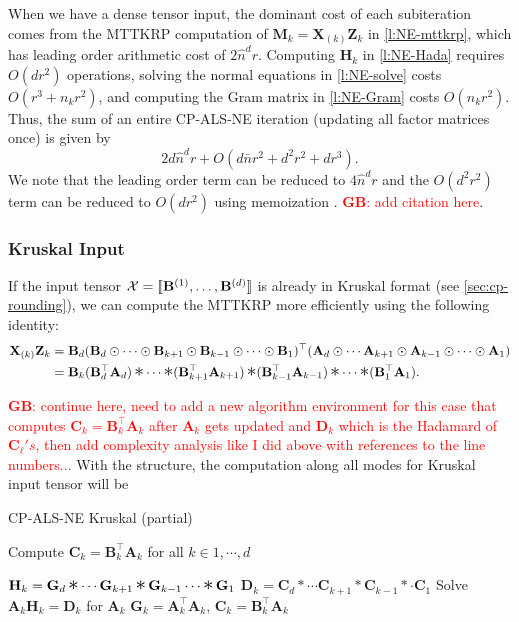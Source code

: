\documentclass{article}
\newcommand{\mat}[1]{\mathbf{#1}}
\newcommand{\T}[2][]{#1{\mathbf{\cal{#2}}}} 						%
\DeclareMathOperator*{\hada}{\scalebox{1.5}{$\ast$}}
\newcommand{\GB}[1]{\textcolor{red}{\textbf{GB}: #1}}
\begin{document}
When we have a dense tensor input, the dominant cost of each subiteration comes from the MTTKRP computation of $\mat{M}_k = \mat{X}_{(k)}\mat{Z}_k$ in \cref{l:NE-mttkrp}, which has leading order arithmetic cost of $2\hat n^dr$.
Computing $\mat{H}_k$ in \cref{l:NE-Hada} requires $O(dr^2)$ operations, solving the normal equations in \cref{l:NE-solve} costs $O(r^3+n_kr^2)$, and computing the Gram matrix in \cref{l:NE-Gram} costs $O(n_kr^2)$.
Thus, the sum of an entire CP-ALS-NE iteration (updating all factor matrices once) is given by
\begin{equation*}
2d\hat n^dr + O(d\bar n r^2 + d^2r^2 + dr^3).
\end{equation*}
We note that the leading order term can be reduced to $4\hat n^d r$ and the $O(d^2r^2)$ term can be reduced to $O(dr^2)$ using memoization \cite{phan2013fast}. \GB{add citation here}.

\subsubsection{Kruskal Input}
If the input tensor $\T{X}=[\![\mat{B}^{(1)}, \dots ,\mat{B}^{(d)}]\!]$ is already in Kruskal format (see \cref{sec:cp-rounding}), we can compute the MTTKRP more efficiently using the following identity:
\begin{align*}
  \mat{X}_{(k)}\mat{Z}_k &= \mat{B}_d(\mat{B}_d \odot \dots \odot \mat{B}_{k+1} \odot \mat{B}_{k-1} \odot \dots \odot \mat{B}_1)^\top(\mat{A}_d \odot \cdots \mat{A}_{k+1} \odot \mat{A}_{k-1} \odot \cdots \odot \mat{A}_1) \\
 &= \mat{B}_k(\mat{B}_d^\top\mat{A}_d) \hada \cdots \hada (\mat{B}_{k+1}^\top\mat{A}_{k+1}) \hada (\mat{B}_{k-1}^\top\mat{A}_{k-1}) \hada \cdots \hada (\mat{B}_1^\top\mat{A}_1).  
\end{align*}

\GB{continue here, need to add a new algorithm environment for this case that computes $\mat{C}_k = \mat{B}_{k}^\top\mat{A}_{k}$ after $\mat{A}_k$ gets updated and $\mat{D}_k$ which is the Hadamard of $\mat{C}_\ell's$, then add complexity analysis like I did above with references to the line numbers...}
With the structure, the computation along all modes for Kruskal input tensor will be 
\begin{algorithm}[!ht]
  \caption{CP-ALS-NE Kruskal (partial)}
  \begin{algorithmic}
    \State Compute $\mat{C}_k = \mat{B}_k^\top\mat{A}_k$ for all $k \in {1,\cdots,d}$
    
      \State $\mat{H}_k = \mat{G}_d \hada \cdots \mat{G}_{k+1} \hada \mat{G}_{k-1} \cdots \hada \mat{G}_1$ \Comment{Compute $\mat{Z}_k^\top \mat{Z}_k$} 
      \State $\mat{D}_k = \mat{C}_d \ast \cdots \mat{C}_{k+1}\ast \mat{C}_{k-1}\ast \cdot \mat{C}_1$ \Comment{Compute $\mat{X}_{(k)\mat{Z}_n}$}
      \State Solve $\mat{A}_k \mat{H}_k = \mat{D}_{k}$ for $\mat{A}_k$  \label{l:NE-solve}
      \State $\mat{G}_k = \mat{A}_k^\top\mat{A}_k$, $\mat{C}_k = \mat{B}_k^\top\mat{A}_k$    \label{l:NE-Gram}
    \EndFor
  \end{algorithmic}
\end{algorithm}
\end{document}
